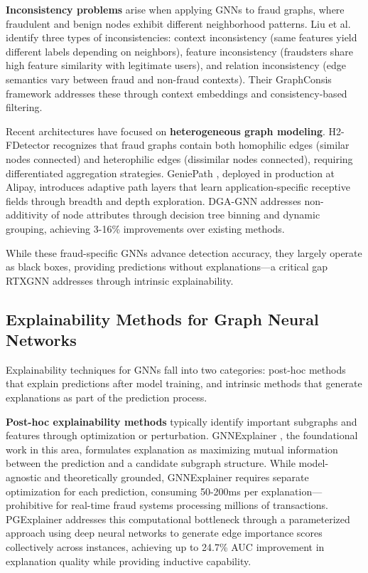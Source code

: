 \textbf{Inconsistency problems} arise when applying GNNs to fraud graphs, where fraudulent and benign nodes exhibit different neighborhood patterns. Liu et al. \citep{liu2020graphconsis} identify three types of inconsistencies: context inconsistency (same features yield different labels depending on neighbors), feature inconsistency (fraudsters share high feature similarity with legitimate users), and relation inconsistency (edge semantics vary between fraud and non-fraud contexts). Their GraphConsis framework addresses these through context embeddings and consistency-based filtering.

Recent architectures have focused on \textbf{heterogeneous graph modeling}. H2-FDetector \citep{shi2022h2fdetector} recognizes that fraud graphs contain both homophilic edges (similar nodes connected) and heterophilic edges (dissimilar nodes connected), requiring differentiated aggregation strategies. GeniePath \citep{liu2019geniepath}, deployed in production at Alipay, introduces adaptive path layers that learn application-specific receptive fields through breadth and depth exploration. DGA-GNN \citep{duan2024dgagnn} addresses non-additivity of node attributes through decision tree binning and dynamic grouping, achieving 3-16\% improvements over existing methods.

While these fraud-specific GNNs advance detection accuracy, they largely operate as black boxes, providing predictions without explanations—a critical gap RTXGNN addresses through intrinsic explainability.

\subsection{Explainability Methods for Graph Neural Networks}

Explainability techniques for GNNs fall into two categories: post-hoc methods that explain predictions after model training, and intrinsic methods that generate explanations as part of the prediction process.

\textbf{Post-hoc explainability methods} typically identify important subgraphs and features through optimization or perturbation. GNNExplainer \citep{ying2019gnnexplainer}, the foundational work in this area, formulates explanation as maximizing mutual information between the prediction and a candidate subgraph structure. While model-agnostic and theoretically grounded, GNNExplainer requires separate optimization for each prediction, consuming 50-200ms per explanation—prohibitive for real-time fraud systems processing millions of transactions. PGExplainer \citep{luo2020pgexplainer} addresses this computational bottleneck through a parameterized approach using deep neural networks to generate edge importance scores collectively across instances, achieving up to 24.7\% AUC improvement in explanation quality while providing inductive capability.

